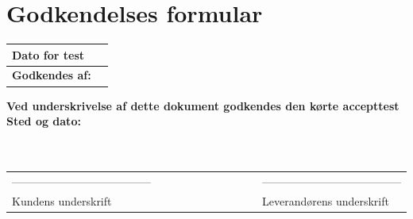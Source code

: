 \section{Godkendelses formular}
\begin{table}[h!]
\label{tab:tabel19}
\begin{tabular}{| l | >{\raggedright\arraybackslash}p{12cm} |}
   \hline
   \textbf{Dato for test} &\\ \hline
   \textbf{Godkendes af:} & \\ \hline
\end{tabular}
\end{table}
\textbf{Ved underskrivelse af dette dokument godkendes den kørte accepttest}
\newline
\textbf{Sted og dato:}\\
\\
\\
\begin{table}
[h!]
\begin{tabular}{ l lllllllll l}
--------------------------------------&&&&&&&&&&--------------------------------------\\ 
Kundens underskrift &&&&&&&&&&Leverandørens underskrift\\
\end{tabular}
\end{table}

